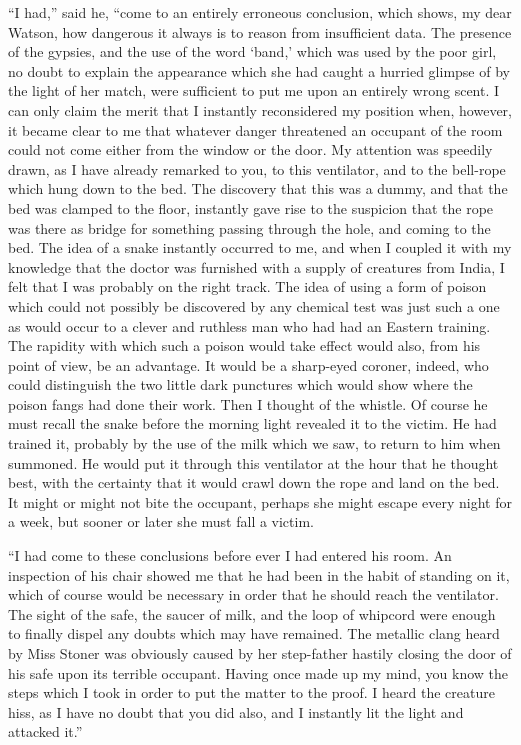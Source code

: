 “I had,” said he, “come to an entirely erroneous conclusion,
which shows, my dear Watson, how dangerous it always is to
reason from insufficient data. The presence of the gypsies,
and the use of the word ‘band,’ which was used by the poor
girl, no doubt to explain the appearance which she had caught
a hurried glimpse of by the light of her match, were sufficient
to put me upon an entirely wrong scent. I can only claim
the merit that I instantly reconsidered my position when,
however, it became clear to me that whatever danger threatened
an occupant of the room could not come either from the
window or the door. My attention was speedily drawn, as I
have already remarked to you, to this ventilator, and to the
bell-rope which hung down to the bed. The discovery that
this was a dummy, and that the bed was clamped to the floor,
instantly gave rise to the suspicion that the rope was there as
bridge for something passing through the hole, and coming to
the bed. The idea of a snake instantly occurred to me, and
when I coupled it with my knowledge that the doctor was
furnished with a supply of creatures from India, I felt that I
was probably on the right track. The idea of using a form
of poison which could not possibly be discovered by any
chemical test was just such a one as would occur to a clever
and ruthless man who had had an Eastern training. The
rapidity with which such a poison would take effect would
also, from his point of view, be an advantage. It would be a
sharp-eyed coroner, indeed, who could distinguish the two little
dark punctures which would show where the poison fangs
had done their work. Then I thought of the whistle. Of
course he must recall the snake before the morning light revealed
it to the victim. He had trained it, probably by the
use of the milk which we saw, to return to him when summoned.
He would put it through this ventilator at the hour
that he thought best, with the certainty that it would crawl
down the rope and land on the bed. It might or might not
bite the occupant, perhaps she might escape every night for a
week, but sooner or later she must fall a victim.

“I had come to these conclusions before ever I had entered
his room. An inspection of his chair showed me that he had
been in the habit of standing on it, which of course would be
necessary in order that he should reach the ventilator. The
sight of the safe, the saucer of milk, and the loop of
whipcord were enough to finally dispel any doubts which may
have remained. The metallic clang heard by Miss Stoner
was obviously caused by her step-father hastily closing the door
of his safe upon its terrible occupant. Having once made up
my mind, you know the steps which I took in order to put the
matter to the proof. I heard the creature hiss, as I have no
doubt that you did also, and I instantly lit the light and attacked
it.”

